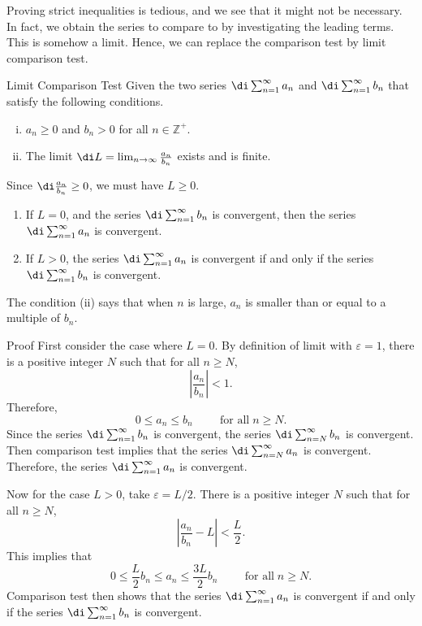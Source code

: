 Proving strict inequalities is tedious, and we see that it might not be necessary. In fact, we obtain the series to compare to by investigating the leading terms. This is somehow a limit. Hence, we can replace the comparison test by limit comparison test.  


\begin{theorem}{Limit Comparison Test}
Given the two series  $\di\sum_{n=1}^{\infty}a_n$ and $\di\sum_{n=1}^{\infty}b_n$ that satisfy the following conditions.
 
\begin{enumerate}[(i)]
\item $a_n\geq 0$ and $b_n>0$ for all $n\in\mathbb{Z}^+$.
\item The limit $\di L=\lim_{n\to\infty} \frac{a_n}{b_n} $ exists and is finite. 
\end{enumerate}Since $\di \frac{a_n}{b_n}\geq 0$, we must have $L\geq 0$.
\begin{enumerate}[1.]
\item If $L=0$, and the  series $\di\sum_{n=1}^{\infty}b_n$ is convergent, then the series $\di\sum_{n=1}^{\infty}a_n$ is convergent.
\item If  $L>0$,   the  series $\di\sum_{n=1}^{\infty}a_n$ is convergent if and only if the series $\di\sum_{n=1}^{\infty}b_n$ is convergent.
\end{enumerate}

\end{theorem} The   condition  (ii)  says that when $n$ is large, $a_n$ is smaller than or equal to a multiple of   $b_n$.  
\begin{myproof}{Proof}
First consider the case where $L=0$.
By definition of limit with $\varepsilon=1$, there is a positive integer $N$ such that for all $n\geq N$, 
\[\left| \frac{a_n}{b_n} \right|< 1.\]
Therefore,
\[0\leq a_n\leq b_n\hspace{1cm}\text{for all}\; n\geq N.\]
Since the series $\di\sum_{n=1}^{\infty}b_n$ is convergent,  the series $\di\sum_{n=N}^{\infty}  b_n$ is convergent. Then comparison test implies that the series $\di \sum_{n=N}^{\infty} a_n $ is convergent. Therefore, the series $\di \sum_{n=1}^{\infty} a_n $ is convergent.  

Now for the case $L>0$, take $\varepsilon=L/2$. There is a positive integer $N$ such that for all $n\geq N$, 
\[\left| \frac{a_n}{b_n} -L\right|<\frac{L}{2}.\]
This implies that
\[0\leq \frac{L}{2}b_n \leq a_n\leq\frac{3L}{2} b_n\hspace{1cm}\text{for all}\; n\geq N.\]
Comparison test then shows that  the  series $\di\sum_{n=1}^{\infty}a_n$ is convergent if and only if the series $\di\sum_{n=1}^{\infty}b_n$ is convergent.
\end{myproof}


